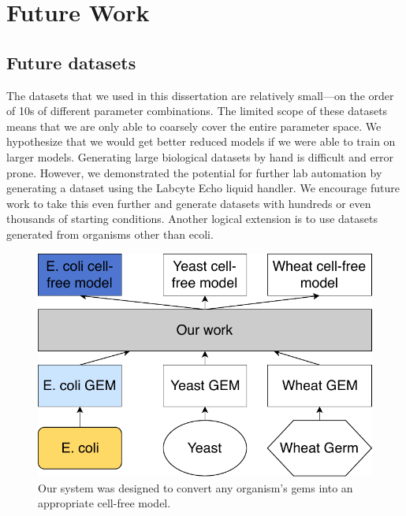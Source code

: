 \chapter{Future Work} 

\section{Future datasets}
The datasets that we used in this dissertation are relatively small---on the order of 10s of different parameter combinations.
The limited scope of these datasets means that we are only able to coarsely cover the entire parameter space.
We hypothesize that we would get better reduced models if we were able to train on larger models.
Generating large biological datasets by hand is difficult and error prone.
However, we demonstrated the potential for further lab automation by generating a dataset using the Labcyte Echo liquid handler.
We encourage future work to take this even further and generate datasets with hundreds or even thousands of starting conditions.
Another logical extension is to use datasets generated from organisms other than \gls{ecoli}.

\begin{figure}[t!]
\begin{center}
\includegraphics{figs/Vision.pdf}
\caption[Our system can generate cell-free models for any organism]
{Our system was designed to convert any organism's \glspl{gem} into an appropriate cell-free model.
}
\end{center}
\label{fig:vision}
\end{figure}

